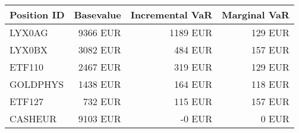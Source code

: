 \center
\begin{tabular}{l|r|r|r }
Position ID& Basevalue & Incremental VaR & Marginal VaR\\ \hline\hline
LYX0AG &      9366 EUR &      1189 EUR&       129 EUR\\
LYX0BX &      3082 EUR &       484 EUR&       157 EUR\\
ETF110 &      2467 EUR &       319 EUR&       129 EUR\\
GOLDPHYS &      1438 EUR &       164 EUR&       118 EUR\\
ETF127 &       732 EUR &       115 EUR&       157 EUR\\
CASHEUR &      9103 EUR &        -0 EUR&         0 EUR\\
\end{tabular}
